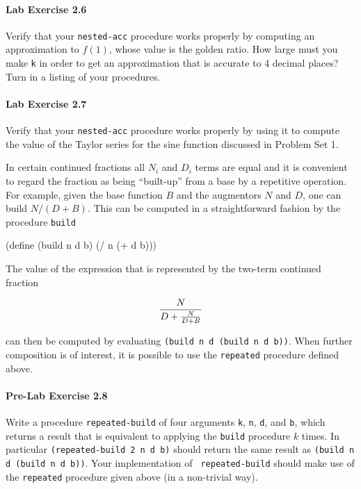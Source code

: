 \paragraph{Lab Exercise 2.6}

Verify that your {\tt nested-acc} procedure works properly
by computing an approximation to $f(1)$, whose value is
the golden ratio. How large must you make {\tt k}
in order to get an approximation that is accurate to 4 decimal places?
Turn in a listing of your procedures.

\paragraph{Lab Exercise 2.7}
Verify that your {\tt nested-acc} procedure works
properly by using it to compute the value of the Taylor series for the
sine function discussed in Problem Set 1. 

In certain continued fractions all $N_i$ and $D_i$ terms are equal
and it is convenient to regard the fraction as
being ``built-up'' from a base by a repetitive operation. For
example, given the base function $B$ and the augmentors
$N$ and $D$, one can build $N/(D+B)$. This can be computed in a
straightforward fashion by the procedure {\tt build}

\beginlisp
(define (build n d b)
  (/ n (+ d b)))
\endlisp

The value of the expression that is represented by the two-term
continued fraction 

\begin{displaymath} 
{N \over {D+{N \over {D+B}}}}
\end{displaymath} 

can then be computed by evaluating {\tt (build n d (build n d b))}. 
When further composition is of interest, it is possible to use the
{\tt repeated} procedure defined above.

\paragraph{ Pre-Lab Exercise 2.8 }
Write a procedure {\tt repeated-build} of four arguments {\tt k}, 
{\tt n}, {\tt d}, and {\tt b}, which returns a result
that is equivalent to applying the {\tt build} procedure $k$ times. In
particular {\tt (repeated-build 2 n d b)} should return the same result
as  {\tt  (build  n  d  (build  n  d  b))}.  Your  implementation  of  {\tt
repeated-build} should make use of the {\tt repeated} procedure given above
(in a non-trivial way).

